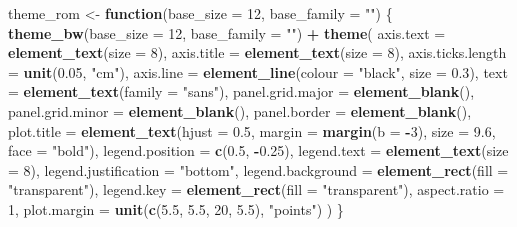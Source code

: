 \documentclass[]{article}
\newenvironment{Shaded}{\begin{snugshade}}{\end{snugshade}}
\newcommand{\KeywordTok}[1]{\textcolor[rgb]{0.13,0.29,0.53}{\textbf{#1}}}
\newcommand{\DataTypeTok}[1]{\textcolor[rgb]{0.13,0.29,0.53}{#1}}
\newcommand{\DecValTok}[1]{\textcolor[rgb]{0.00,0.00,0.81}{#1}}
\newcommand{\FloatTok}[1]{\textcolor[rgb]{0.00,0.00,0.81}{#1}}
\newcommand{\StringTok}[1]{\textcolor[rgb]{0.31,0.60,0.02}{#1}}
\newcommand{\ControlFlowTok}[1]{\textcolor[rgb]{0.13,0.29,0.53}{\textbf{#1}}}
\newcommand{\OperatorTok}[1]{\textcolor[rgb]{0.81,0.36,0.00}{\textbf{#1}}}
\newcommand{\NormalTok}[1]{#1}
\begin{document}
\begin{Shaded}
\begin{Highlighting}[]
\NormalTok{theme_rom <-}\StringTok{ }\ControlFlowTok{function}\NormalTok{(}\DataTypeTok{base_size =} \DecValTok{12}\NormalTok{, }\DataTypeTok{base_family =} \StringTok{""}\NormalTok{) \{}
  \KeywordTok{theme_bw}\NormalTok{(}\DataTypeTok{base_size =} \DecValTok{12}\NormalTok{, }\DataTypeTok{base_family =} \StringTok{""}\NormalTok{) }\OperatorTok{+}
\StringTok{    }\KeywordTok{theme}\NormalTok{(}
      \DataTypeTok{axis.text =} \KeywordTok{element_text}\NormalTok{(}\DataTypeTok{size =} \DecValTok{8}\NormalTok{), }
      \DataTypeTok{axis.title =} \KeywordTok{element_text}\NormalTok{(}\DataTypeTok{size =} \DecValTok{8}\NormalTok{),}
      \DataTypeTok{axis.ticks.length =} \KeywordTok{unit}\NormalTok{(}\FloatTok{0.05}\NormalTok{, }\StringTok{"cm"}\NormalTok{),}
      \DataTypeTok{axis.line =} \KeywordTok{element_line}\NormalTok{(}\DataTypeTok{colour =} \StringTok{"black"}\NormalTok{,}
                               \DataTypeTok{size =} \FloatTok{0.3}\NormalTok{), }
      \DataTypeTok{text =} \KeywordTok{element_text}\NormalTok{(}\DataTypeTok{family =} \StringTok{"sans"}\NormalTok{),}
      \DataTypeTok{panel.grid.major =} \KeywordTok{element_blank}\NormalTok{(),}
      \DataTypeTok{panel.grid.minor =} \KeywordTok{element_blank}\NormalTok{(),}
      \DataTypeTok{panel.border =} \KeywordTok{element_blank}\NormalTok{(),}
      \DataTypeTok{plot.title =} \KeywordTok{element_text}\NormalTok{(}\DataTypeTok{hjust =} \FloatTok{0.5}\NormalTok{, }
                                \DataTypeTok{margin =} \KeywordTok{margin}\NormalTok{(}\DataTypeTok{b =} \OperatorTok{-}\DecValTok{3}\NormalTok{), }
                                \DataTypeTok{size =} \FloatTok{9.6}\NormalTok{, }
                                \DataTypeTok{face =} \StringTok{"bold"}\NormalTok{),}
      \DataTypeTok{legend.position =} \KeywordTok{c}\NormalTok{(}\FloatTok{0.5}\NormalTok{, }\OperatorTok{-}\FloatTok{0.25}\NormalTok{),}
      \DataTypeTok{legend.text =} \KeywordTok{element_text}\NormalTok{(}\DataTypeTok{size =} \DecValTok{8}\NormalTok{),}
      \DataTypeTok{legend.justification =} \StringTok{"bottom"}\NormalTok{, }
      \DataTypeTok{legend.background =} \KeywordTok{element_rect}\NormalTok{(}\DataTypeTok{fill =} \StringTok{"transparent"}\NormalTok{), }
      \DataTypeTok{legend.key =} \KeywordTok{element_rect}\NormalTok{(}\DataTypeTok{fill =} \StringTok{"transparent"}\NormalTok{),}
      \DataTypeTok{aspect.ratio =} \DecValTok{1}\NormalTok{,}
      \DataTypeTok{plot.margin =} \KeywordTok{unit}\NormalTok{(}\KeywordTok{c}\NormalTok{(}\FloatTok{5.5}\NormalTok{, }\FloatTok{5.5}\NormalTok{, }\DecValTok{20}\NormalTok{, }\FloatTok{5.5}\NormalTok{), }
                         \StringTok{"points"}\NormalTok{)}
\NormalTok{      )}
\NormalTok{\}}
\end{Highlighting}
\end{Shaded}
\end{document}

